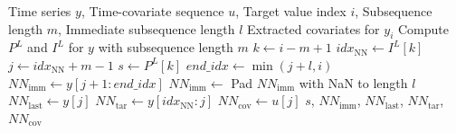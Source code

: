 \begin{algorithm}[t] %
\caption{Feature Engineering via Matrix Profile}
\label{alg:feature_eng}
\begin{algorithmic}[1]
\Require Time series $y$, Time-covariate sequence $u$, Target value index $i$, Subsequence length $m$, Immediate subsequence length $l$
\Ensure Extracted covariates for $y_i$
\State Compute $P^L$ and $I^L$ for $y$ with subsequence length $m$
\State $k \leftarrow i - m + 1$ 
\State $idx_{\text{NN}} \leftarrow I^L[k]$ 
\State $j \leftarrow idx_{\text{NN}} + m - 1$ 
\State $s \leftarrow P^L[k]$ 
\State $end\_idx \leftarrow \min(j+l, i)$ 
\State $NN_{\text{imm}} \leftarrow y[j+1 : end\_idx]$ 
    \State $NN_{\text{imm}} \leftarrow$ Pad $NN_{\text{imm}}$ with NaN to length $l$ 
\EndIf
\State $NN_{\text{last}} \leftarrow y[j]$ 
\State $NN_{\text{tar}} \leftarrow y[idx_{\text{NN}} : j]$ 
\State $NN_{\text{cov}} \leftarrow u[j]$ 
\State \Return $s$, $NN_{\text{imm}}$, $NN_{\text{last}}$, $NN_{\text{tar}}$, $NN_{\text{cov}}$
\end{algorithmic}
\end{algorithm}